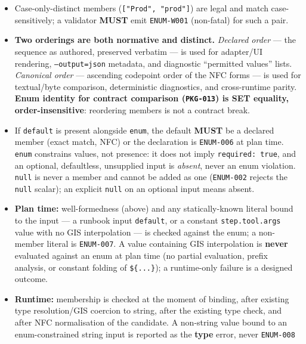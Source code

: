\begin{itemize}
        controls their own file but not what an external system returns.
  \item Case-only-distinct members (\texttt{["Prod", "prod"]}) are legal and
        match case-sensitively; a validator \textbf{MUST} emit
        \texttt{ENUM-W001} (non-fatal) for such a pair.
  \item \textbf{Two orderings are both normative and distinct.}
        \emph{Declared order} --- the sequence as authored, preserved
        verbatim --- is used for adapter/UI rendering, \texttt{--output=json}
        metadata, and diagnostic ``permitted values'' lists.
        \emph{Canonical order} --- ascending codepoint order of the NFC
        forms --- is used for textual/byte comparison, deterministic
        diagnostics, and cross-runtime parity. \textbf{Enum identity for
        contract comparison (\texttt{PKG-013}) is SET equality,
        order-insensitive}: reordering members is not a contract break.
  \item If \texttt{default} is present alongside \texttt{enum}, the default
        \textbf{MUST} be a declared member (exact match, NFC) or the
        declaration is \texttt{ENUM-006} at plan time. \texttt{enum}
        constrains values, not presence: it does not imply
        \texttt{required: true}, and an optional, defaultless, unsupplied
        input is \emph{absent}, never an enum violation. \texttt{null} is
        never a member and cannot be added as one (\texttt{ENUM-002}
        rejects the \texttt{null} scalar); an explicit \texttt{null} on an
        optional input means absent.
  \item \textbf{Plan time:} well-formedness (above) and any statically-known
        literal bound to the input --- a runbook input \texttt{default}, or
        a constant \texttt{step.tool.args} value with no GIS interpolation
        --- is checked against the enum; a non-member literal is
        \texttt{ENUM-007}. A value containing GIS interpolation is
        \textbf{never} evaluated against an enum at plan time (no partial
        evaluation, prefix analysis, or constant folding of
        \texttt{\$\{...\}}); a runtime-only failure is a designed outcome.
  \item \textbf{Runtime:} membership is checked at the moment of binding,
        after existing type resolution/GIS coercion to string, after the
        existing type check, and after NFC normalisation of the candidate.
        A non-string value bound to an enum-constrained string input is
        reported as the \textbf{type} error, never \texttt{ENUM-008}

\end{itemize}
